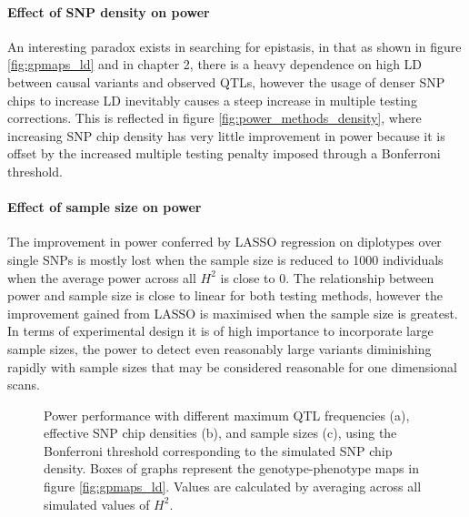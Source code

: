\paragraph{Effect of SNP density on power}
An interesting paradox exists in searching for epistasis, in that as shown in figure \ref{fig:gpmaps_ld} and in chapter 2, there is a heavy dependence on high LD between causal variants and observed QTLs, however the usage of denser SNP chips to increase LD inevitably causes a steep increase in multiple testing corrections. This is reflected in figure \ref{fig:power_methods_density}, where increasing SNP chip density has very little improvement in power because it is offset by the increased multiple testing penalty imposed through a Bonferroni threshold.

\paragraph{Effect of sample size on power}
The improvement in power conferred by LASSO regression on diplotypes over single SNPs is mostly lost when the sample size is reduced to 1000 individuals when the average power across all $H^{2}$ is close to 0. The relationship between power and sample size is close to linear for both testing methods, however the improvement gained from LASSO is maximised when the sample size is greatest. In terms of experimental design it is of high importance to incorporate large sample sizes, the power to detect even reasonably large variants diminishing rapidly with sample sizes that may be considered reasonable for one dimensional scans.


\begin{figure}
\begin{center}
\begin{center}
\caption[Power performance under different conditions]{Power performance with different maximum QTL frequencies (a), effective SNP chip densities (b), and sample sizes (c), using the Bonferroni threshold corresponding to the simulated SNP chip density. Boxes of graphs represent the genotype-phenotype maps in figure \ref{fig:gpmaps_ld}. Values are calculated by averaging across all simulated values of $H^{2}$.}
\label{fig:power_methods_extended}
\end{center}
\end{center}
\end{figure}


